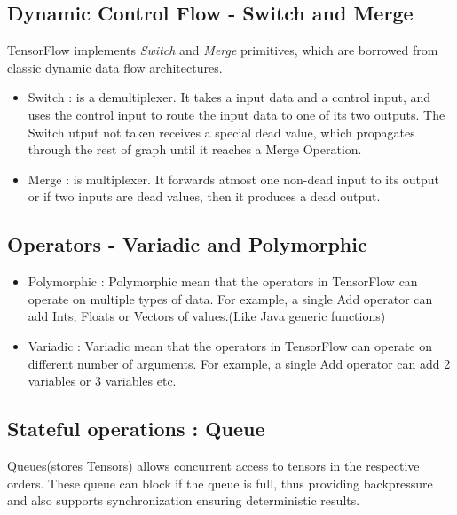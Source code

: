 \documentclass[twoside]{article}
\begin{document}
\subsection{Dynamic Control Flow - Switch and Merge}

TensorFlow implements \textit{Switch} and \textit{Merge} primitives, which are borrowed from classic dynamic data flow architectures.

\begin{itemize}
\item Switch : is a demultiplexer. It takes a input data and a control input, and uses the control input to route the input data to one of its two outputs. The Switch utput not taken receives a special dead value, which propagates through the rest of graph until it reaches a Merge Operation.
\item Merge : is multiplexer. It forwards atmost one non-dead input to its output or if two inputs are dead values, then it produces a dead output. 
\end{itemize} 

\subsection{Operators - Variadic and Polymorphic}

\begin{itemize}
\item Polymorphic : Polymorphic mean that the operators in TensorFlow can operate on multiple types of data.
For example, a single Add operator can add Ints, Floats or Vectors of values.(Like Java generic functions)

\item Variadic : Variadic mean that the operators in TensorFlow can operate on different number of arguments.
For example, a single Add operator can add 2 variables or 3 variables etc.
\end{itemize}

\subsection{Stateful operations : Queue}

Queues(stores Tensors) allows concurrent access to tensors in the respective orders. These queue can block if the queue is full, thus providing backpressure and also supports synchronization ensuring deterministic results.
\end{document}
